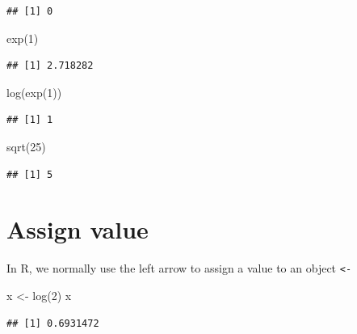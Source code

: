 \documentclass[
  11pt,
]{book}
\newenvironment{Shaded}{\begin{snugshade}}{\end{snugshade}}
\newcommand{\DecValTok}[1]{\textcolor[rgb]{0.00,0.00,0.81}{#1}}
\newcommand{\FunctionTok}[1]{\textcolor[rgb]{0.00,0.00,0.00}{#1}}
\newcommand{\NormalTok}[1]{#1}
\newcommand{\OtherTok}[1]{\textcolor[rgb]{0.56,0.35,0.01}{#1}}
\begin{document}
\begin{verbatim}
## [1] 0
\end{verbatim}

\begin{Shaded}
\begin{Highlighting}[]
\FunctionTok{exp}\NormalTok{(}\DecValTok{1}\NormalTok{)}
\end{Highlighting}
\end{Shaded}

\begin{verbatim}
## [1] 2.718282
\end{verbatim}

\begin{Shaded}
\begin{Highlighting}[]
\FunctionTok{log}\NormalTok{(}\FunctionTok{exp}\NormalTok{(}\DecValTok{1}\NormalTok{))}
\end{Highlighting}
\end{Shaded}

\begin{verbatim}
## [1] 1
\end{verbatim}

\begin{Shaded}
\begin{Highlighting}[]
\FunctionTok{sqrt}\NormalTok{(}\DecValTok{25}\NormalTok{)}
\end{Highlighting}
\end{Shaded}

\begin{verbatim}
## [1] 5
\end{verbatim}

\hypertarget{assign-value}{%
\section{Assign value}\label{assign-value}}

In R, we normally use the left arrow to assign a value to an object \texttt{\textless{}-}

\begin{Shaded}
\begin{Highlighting}[]
\NormalTok{x }\OtherTok{\textless{}{-}} \FunctionTok{log}\NormalTok{(}\DecValTok{2}\NormalTok{)}
\NormalTok{x}
\end{Highlighting}
\end{Shaded}

\begin{verbatim}
## [1] 0.6931472
\end{verbatim}
\end{document}
